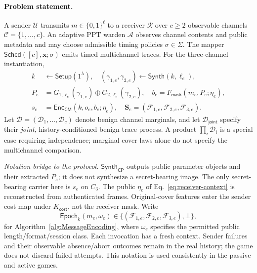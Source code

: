 \documentclass[pdflatex,sn-mathphys-num]{sn-jnl}%
\theoremstyle{definition}
\theoremstyle{game}
\theoremstyle{thmstyleone}%
\theoremstyle{thmstyletwo}%
\theoremstyle{thmstylethree}%
\begin{document}
\paragraph{Problem statement.}
A sender $\mathcal U$ transmits $m\in\{0,1\}^{\ell}$ to a receiver
$\mathcal R$ over $c\ge2$ observable channels
$\mathcal C=\{1,\ldots,c\}$. An adaptive PPT warden $\mathcal A$ observes
channel contents and public metadata and may choose admissible timing
policies $\sigma\in\Sigma$. The mapper
$\mathsf{Sched}([c],\mathbf x;\sigma)$ emits timed multichannel traces.
For the three-channel instantiation,
\[
\begin{aligned}
 k&\leftarrow\mathsf{Setup}(1^\lambda),\quad
 (\gamma_{1,e},\gamma_{2,e})\leftarrow\mathsf{Synth}(k,\ell_e),\\
 P_e&=G_{1,\ell_e}(\gamma_{1,e})\oplus G_{2,\ell_e}(\gamma_{2,e}),\quad
 b_e=F_{\mathsf{mask}}(m_e,P_e;\eta_e),\\
 s_e&=\mathsf{Enc}_{\mathsf{CM}}(k,o_e,b_e;\eta_e),\quad
 \mathbf S_e=(\mathcal F_{1,e},\mathcal F_{2,e},\mathcal F_{3,e}).
\end{aligned}
\]
Let $\mathbf{\mathcal D}=(\mathcal D_1,\ldots,\mathcal D_c)$ denote benign
channel marginals, and let $\mathcal D_{\mathsf{joint}}$ specify their
\emph{joint}, history-conditioned benign trace process. A product
$\prod_i\mathcal D_i$ is a special case requiring independence; marginal
cover laws alone do not specify the multichannel comparison.

\textit{Notation bridge to the protocol.}
$\mathsf{Synth}_{\mathsf{CP}}$ outputs public parameter objects and their
extracted $P_e$; it does not synthesize a secret-bearing image. The only
secret-bearing carrier here is $s_e$ on $C_3$. The public $\eta_e$ of
Eq.~\eqref{eq:receiver-context} is reconstructed from authenticated frames.
Original-cover features enter the sender cost map under $K_{\mathsf{cost}}$,
not the receiver mask. Write
\[
\mathsf{Epoch}_k(m_e,\omega_e)
\in\{(\mathcal F_{1,e},\mathcal F_{2,e},\mathcal F_{3,e}),\bot\},
\]
for Algorithm~\ref{alg:MessageEncoding}, where $\omega_e$ specifies the
permitted public length/format/session class. Each invocation has a fresh
context. Sender failures and their observable absence/abort outcomes remain
in the real history; the game does not discard failed attempts. This notation is used consistently in the passive and active games.
\end{document}
